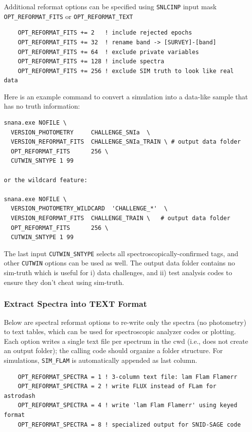 \documentclass[12pt]{article}
\begin{document}
\medskip
Additional reformat options can be specified using {\tt SNLCINP} input mask
{\tt OPT\_REFORMAT\_FITS} or {\tt OPT\_REFORMAT\_TEXT}
\begin{verbatim}  
    OPT_REFORMAT_FITS += 2   ! include rejected epochs
    OPT_REFORMAT_FITS += 32  ! rename band -> [SURVEY]-[band]
    OPT_REFORMAT_FITS += 64  ! exclude private variables
    OPT_REFORMAT_FITS += 128 ! include spectra
    OPT_REFORMAT_FITS += 256 ! exclude SIM truth to look like real data
\end{verbatim}
%
Here is an example command to convert a simulation into a data-like
sample that has no truth information:
\begin{verbatim}    
snana.exe NOFILE \
  VERSION_PHOTOMETRY     CHALLENGE_SNIa  \
  VERSION_REFORMAT_FITS  CHALLENGE_SNIa_TRAIN \ # output data folder
  OPT_REFORMAT_FITS      256 \
  CUTWIN_SNTYPE 1 99

or the wildcard feature:

snana.exe NOFILE \
  VERSION_PHOTOMETRY_WILDCARD  'CHALLENGE_*'  \
  VERSION_REFORMAT_FITS  CHALLENGE_TRAIN \   # output data folder
  OPT_REFORMAT_FITS      256 \
  CUTWIN_SNTYPE 1 99

\end{verbatim}     
%
The last input {\tt CUTWIN\_SNTYPE} selects all 
spectroscopically-confirmed tags, and other {\tt CUTWIN} 
options can be used as well. 
The output data folder contains no sim-truth which
is useful for i) data challenges, and ii) test analysis codes
to ensure they don't cheat using sim-truth.




\clearpage
  \subsubsection{Extract Spectra into TEXT Format}
  \label{sss:extract_spectra}

Below are spectral reformat options to re-write only the spectra (no photometry) 
to text tables, which can be used for
spectroscopic analyzer codes or plotting. 
Each option writes a single text file per spectrum in the cwd 
(i.e., does not create an output folder); 
the calling code should organize a folder structure.
For simulations, {\tt SIM\_FLAM} is automatically appended as last column.

\begin{verbatim}  
    OPT_REFORMAT_SPECTRA = 1 ! 3-column text file: lam Flam Flamerr
    OPT_REFORMAT_SPECTRA = 2 ! write FLUX instead of FLam for astrodash
    OPT_REFORMAT_SPECTRA = 4 ! write 'lam Flam Flamerr' using keyed format
    OPT_REFORMAT_SPECTRA = 8 ! specialized output for SNID-SAGE code
\end{verbatim}
\end{document}
